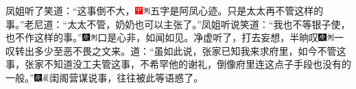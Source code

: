凤姐听了笑道：``这事倒不大，{\includegraphics[width=3mm]{../Images/00002}\includegraphics[width=3mm]{../Images/00011}\footnotesize \kaishu 五字是阿凤心迹。}只是太太再不管这样的事。''老尼道：``太太不管，奶奶也可以主张了。''凤姐听说笑道：``我也不等银子使，也不作这样的事。''{\includegraphics[width=3mm]{../Images/00004}\includegraphics[width=3mm]{../Images/00011}\footnotesize \kaishu 口是心非，如闻如见。}净虚听了，打去妄想，半晌叹{\includegraphics[width=3mm]{../Images/00004}\includegraphics[width=3mm]{../Images/00011}\footnotesize \kaishu 一叹转出多少至恶不畏之文来。}道：``虽如此说，张家已知我来求府里，如今不管这事，张家不知道没工夫管这事，不希罕他的谢礼，倒像府里连这点子手段也没有的一般。''{\includegraphics[width=3mm]{../Images/00004}\includegraphics[width=3mm]{../Images/00010}\footnotesize \kaishu 闺阁营谋说事，往往被此等语惑了。}

